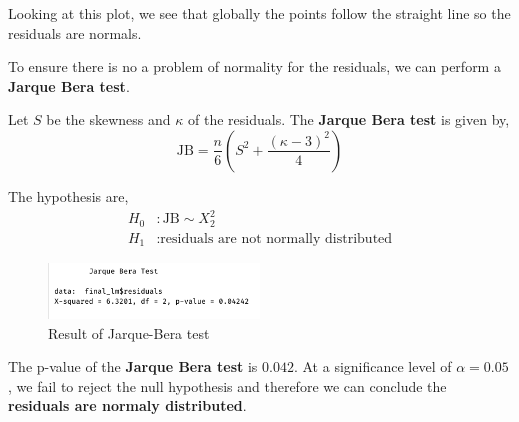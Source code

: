 Looking at this plot, we see that globally the points follow the straight line so the residuals are normals.  

To ensure there is no a problem of normality for the residuals, we can perform a \textbf{Jarque Bera test}. 

Let $S$ be the skewness and $\kappa$ of the residuals. The \textbf{Jarque Bera test} is given by, 
\begin{equation}
	\text{JB} = \frac{n}{6} \left(S^2 + \frac{(\kappa - 3)^2}{4} \right)
\end{equation}

The hypothesis are, 
\begin{align*}
	H_0&: \text{JB} \sim X^2_2 \\
	H_1&: \text{residuals are not normally distributed}
\end{align*}

\begin{figure}[H]
	\centering
	\includegraphics[width=0.5\textwidth]{figures/models/jarque-bera_test.png}
	\caption{Result of Jarque-Bera test}
	\label{fig:jarque-bera-test}
\end{figure}

The p-value of the \textbf{Jarque Bera test} is $0.042$. At a significance level of $\alpha = 0.05$, we fail to reject the null hypothesis and therefore we can conclude the \textbf{residuals are normaly distributed}.